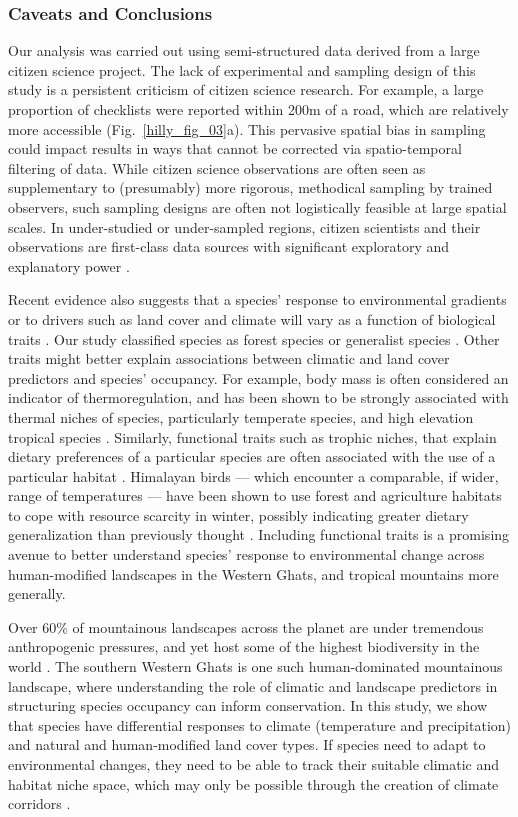\subsubsection*{Caveats and Conclusions}

Our analysis was carried out using semi-structured data derived from a large citizen science project.
The lack of experimental and sampling design of this study is a persistent criticism of citizen science research.
For example, a large proportion of checklists were reported within 200m of a road, which are relatively more accessible (Fig.~\ref{hilly_fig_03}a).
This pervasive spatial bias in sampling could impact results in ways that cannot be corrected via spatio-temporal filtering of data.
While citizen science observations are often seen as supplementary to (presumably) more rigorous, methodical sampling by trained observers, such sampling designs are often not logistically feasible at large spatial scales.
In under-studied or under-sampled regions, citizen scientists and their observations are first-class data sources with significant exploratory and explanatory power \citep{devictor2010,ellwood2017,robinson2020}.

Recent evidence also suggests that a species' response to environmental gradients or to drivers such as land cover and climate will vary as a function of biological traits \citep{mcgill2006}.
Our study classified species as forest species or generalist species \citep{ali1983}.
Other traits might better explain associations between climatic and land cover predictors and species' occupancy.
For example, body mass is often considered an indicator of thermoregulation, and has been shown to be strongly associated with thermal niches of species, particularly temperate species, and high elevation tropical species \citep{barve2021}.
Similarly, functional traits such as trophic niches, that explain dietary preferences of a particular species are often associated with the use of a particular habitat \citep{pigot2020}.
Himalayan birds --- which encounter a comparable, if wider, range of temperatures --- have been shown to use forest and agriculture habitats to cope with resource scarcity in winter, possibly indicating greater dietary generalization than previously thought \citep{elsen2018}.
Including functional traits is a promising avenue to better understand species' response to environmental change across human-modified landscapes in the Western Ghats, and tropical mountains more generally.

Over 60\% of mountainous landscapes across the planet are under tremendous anthropogenic pressures, and yet host some of the highest biodiversity in the world \citep{lasorte2010,elsen2020}.
The southern Western Ghats is one such human-dominated mountainous landscape, where understanding the role of climatic and landscape predictors in structuring species occupancy can inform conservation.
In this study, we show that species have differential responses to climate (temperature and precipitation) and natural and human-modified land cover types.
If species need to adapt to environmental changes, they need to be able to track their suitable climatic and habitat niche space, which may only be possible through the creation of climate corridors \citep{freeman2018}.

